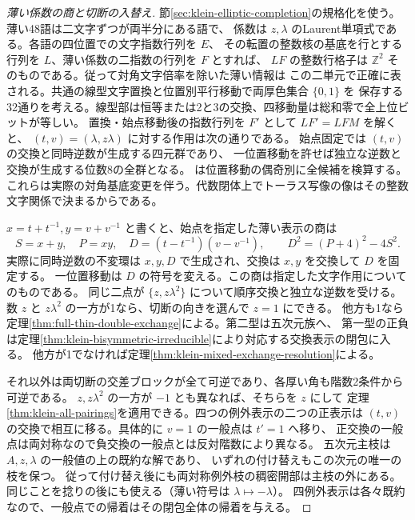 \begin{proof}[薄い係数の商と切断の入替え]
節\ref{sec:klein-elliptic-completion}の規格化を使う。薄い48語は二文字ずつが両半分にある語で、
係数は $z,\lambda$ のLaurent単項式である。各語の四位置での文字指数行列を $E$、
その転置の整数核の基底を行とする行列を $L$、薄い係数の二指数の行列を $F$ とすれば、
$LF$ の整数行格子は $\mathbb Z^2$ そのものである。従って対角文字倍率を除いた薄い情報は
この二単元で正確に表される。共通の線型文字置換と位置別平行移動で両厚色集合 $\{0,1\}$ を
保存する32通りを考える。線型部は恒等または2と3の交換、四移動量は総和零で全上位ビットが等しい。
置換・始点移動後の指数行列を $F'$ として $L F'=LF M$ を解くと、
$(t,v)=(\lambda,z\lambda)$ に対する作用は次の通りである。
始点固定では $(t,v)$ の交換と同時逆数が生成する四元群であり、
一位置移動を許せば独立な逆数と交換が生成する位数8の全群となる。
 は位置移動の偶奇別に全候補を検算する。
これらは実際の対角基底変更を伴う。代数閉体上でトーラス写像の像はその整数文字関係で決まるからである。

$x=t+t^{-1},y=v+v^{-1}$ と書くと、始点を指定した薄い表示の商は
\[
 S=x+y,\quad P=xy,\quad D=(t-t^{-1})(v-v^{-1}),\qquad
 D^2=(P+4)^2-4S^2 .
\]
実際に同時逆数の不変環は $x,y,D$ で生成され、交換は $x,y$ を交換して $D$ を固定する。
一位置移動は $D$ の符号を変える。この商は指定した文字作用についてのものである。
同じ二点が $\{z,z\lambda^2\}$ について順序交換と独立な逆数を受ける。
数 $z$ と $z\lambda^2$ の一方が1なら、切断の向きを選んで $z=1$ にできる。
他方も1なら定理\ref{thm:full-thin-double-exchange}による。第二型は五次元族へ、
第一型の正負は定理\ref{thm:klein-bisymmetric-irreducible}により対応する交換表示の閉包に入る。
他方が1でなければ定理\ref{thm:klein-mixed-exchange-resolution}による。

それ以外は両切断の交差ブロックが全て可逆であり、各厚い角も階数2条件から可逆である。
$z,z\lambda^2$ の一方が $-1$ とも異なれば、そちらを $z$ にして
定理\ref{thm:klein-all-pairings}を適用できる。四つの例外表示の二つの正表示は
$(t,v)$ の交換で相互に移る。具体的に $v=1$ の一般点は $t'=1$ へ移り、
正交換の一般点は両対称なので負交換の一般点とは反対階数により異なる。
五次元主枝は $A,z,\lambda$ の一般値の上の既約な解であり、
いずれの付け替えもこの次元の唯一の枝を保つ。
従って付け替え後にも両対称例外枝の稠密開部は主枝の外にある。
同じことを捻りの後にも使える（薄い符号は $\lambda\mapsto-\lambda$）。
四例外表示は各々既約なので、一般点での帰着はその閉包全体の帰着を与える。
\end{proof}

